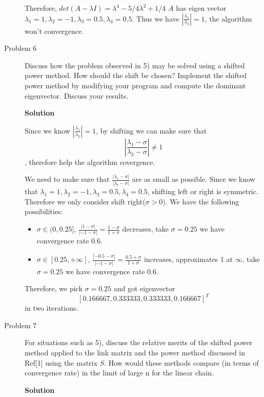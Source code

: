 \documentclass{article}
\begin{document}
\begin{description}
	      Therefore, $det(A - \lambda I) = \lambda^4 - 5/4 \lambda^2 + 1/4$
	      $A$ has eigen vector $\lambda_1 = 1, \lambda_2 = -1, \lambda_3 = 0.5, \lambda_4 = 0.5$.
	      Thus we have $|\frac{\lambda_1}{\lambda_2}| = 1$, the algorithm won't convergence.



	\item[Problem 6] Discuss how the problem observed in 5) may be solved using a shifted power method.
	      How should the shift be chosen?
	      Implement the shifted power method by modifying your program and compute the dominant eigenvector.
	      Discuss your results.

	      \textbf{Solution}

	      Since we know $|\frac{\lambda_1}{\lambda_2}| = 1$, by shifting we can make sure that
	      $$|\frac{\lambda_1 - \sigma}{\lambda_2 - \sigma}| \ne 1$$, therefore help the algorithm covergence.

	      We need to make sure that $\frac{|\lambda_s - \sigma|}{|\lambda_t - \sigma|}$ are as small as possible.
	      Since we know that $\lambda_1 = 1, \lambda_2 = -1, \lambda_3 = 0.5, \lambda_4 = 0.5$, shifting left or right is symmetric.
	      Therefore we only consider shift right($\sigma > 0$).
	      We have the following possibilities:

	      \begin{itemize}
		      \item $\sigma \in (0, 0.25]$, $\frac{|1 - \sigma|}{|-1 - \sigma|} = \frac{1 - \sigma}{1 + \sigma}$ decreases, take $\sigma = 0.25$ we have convergence rate 0.6.
		      \item $\sigma \in [0.25, +\infty]$, $\frac{|-0.5 - \sigma|}{|-1 - \sigma|} = \frac{0.5+\sigma}{1 + \sigma}$ increases, approximates 1 at $\infty$, take $\sigma = 0.25$ we have convergence rate 0.6.
	      \end{itemize}
	      Therefore, we pick $\sigma = 0.25$ and got eigenvector $$[0.166667, 0.333333, 0.333333, 0.166667]^T$$ in two iterations.



	\item[Problem 7] For situations such as 5),
	      discuss the relative merits of the shifted power method applied to the link matrix and the power method discussed in Ref[1] using the matrix $S$.
	      How would these methods compare (in terms of convergence rate) in the limit of large n for the linear chain.

	      \textbf{Solution}


\end{description}
\end{document}

